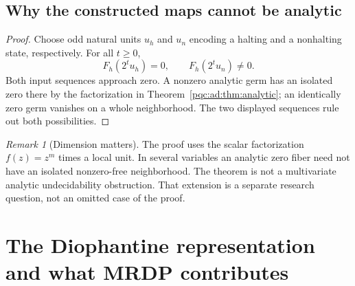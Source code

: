 \documentclass[11pt,letterpaper]{article}
\numberwithin{equation}{section}
\newtheorem{proposition}[theorem]{Proposition}
\theoremstyle{definition}
\theoremstyle{remark}
\newtheorem{remark}[theorem]{Remark}
\newcommand{\srcmark}[1]{\par\noindent{\small\itshape [source~#1]}\par}
\begin{document}
\subsection{Why the constructed maps cannot be analytic}
\begin{proof}
Choose odd natural units $u_h$ and $u_n$ encoding a halting and a
nonhalting state, respectively. For all $t\ge0$,
\[
F_h(2^tu_h)=0,\qquad F_h(2^tu_n)\ne0.
\]
Both input sequences approach zero. A nonzero analytic germ has an
isolated zero there by the factorization in
Theorem~\ref{pqc:ad:thm:analytic}; an identically zero germ vanishes on a whole
neighborhood. The two displayed sequences rule out both possibilities.
\end{proof}

\begin{remark}[Dimension matters]
The proof uses the scalar factorization $f(z)=z^m$ times a local unit.
In several variables an analytic zero fiber need not have an isolated
nonzero-free neighborhood. The theorem is not a multivariate analytic
undecidability obstruction. That extension is a separate research
question, not an omitted case of the proof.
\end{remark}

\section{The Diophantine representation and what MRDP contributes}\label{pqc:ad:sec:mrdp}
\srcmark{12}
\end{document}

